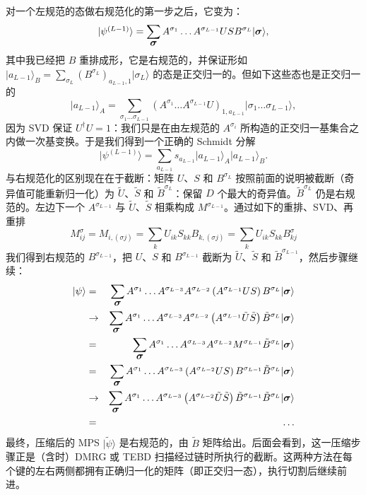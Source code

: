 \documentclass[a4paper,10pt,oneside,onecolumn,1p,times]{elsarticle}
\newcommand{\ket}[1]{\mbox{$| #1  \rangle$}}
\newcommand{\fat}[1]{\mbox{\boldmath$#1$\unboldmath}}	%
\begin{document}
对一个左规范的态做右规范化的第一步之后，它变为：
\begin{equation}
\ket{\psi^{(L-1)}} = \sum_{\fat{\sigma}} A^{\sigma_1} \ldots A^{\sigma_{L-1}} U S B^{\sigma_L} \ket{\fat{\sigma}} ,
\end{equation}
其中我已经把 $B$ 重排成形，它是右规范的，并保证形如 $\ket{a_{L-1}}_B = \sum_{\sigma_L} (B^{\sigma_L})_{a_{L-1},1} \ket{\sigma_L}$ 的态是正交归一的。但如下这些态也是正交归一的
\begin{equation}
\ket{a_{L-1}}_A = \sum_{\sigma_1 \ldots \sigma_{L-1}} (A^{\sigma_1} \ldots A^{\sigma_{L-1}} U)_{1,a_{L-1}} \ket{\sigma_1 \ldots \sigma_{L-1}},
\end{equation}
因为 SVD 保证 $U^\dagger U = 1$：我们只是在由左规范的 $A^{\sigma_i}$ 所构造的正交归一基集合之内做一次基变换。于是我们得到一个正确的 Schmidt 分解
\begin{equation}
\ket{\psi^{(L-1)}} = \sum_{a_{L-1}} s_{a_{L-1}} \ket{a_{L-1}}_A \ket{a_{L-1}}_B .
\end{equation}
与右规范化的区别现在在于截断：矩阵 $U$、$S$ 和 $B^{\sigma_L}$ 按照前面的说明被截断（奇异值可能重新归一化）为 $\tilde{U}$、$\tilde{S}$ 和 $\tilde{B}^{\sigma_L}$：保留 $D$ 个最大的奇异值。$\tilde{B}^{\sigma_L}$ 仍是右规范的。左边下一个 $A^{\sigma_{L-1}}$ 与 $\tilde{U}$、$\tilde{S}$ 相乘构成 $M^{\sigma_{L-1}}$。通过如下的重排、SVD、再重排
\begin{equation}
M^{\sigma}_{ij} = M_{i, (\sigma j)} = \sum_k U_{ik} S_{kk} B_{k,(\sigma j)} = \sum_k U_{ik} S_{kk} B^{\sigma}_{kj} 
\end{equation} 
我们得到右规范的 $B^{\sigma_{L-1}}$，把 $U$、$S$ 和 $B^{\sigma_{L-1}}$ 截断为 $\tilde{U}$、$\tilde{S}$ 和 $\tilde{B}^{\sigma_{L-1}}$，然后步骤继续：
\begin{eqnarray*}
\ket{\psi} &=& \sum_{\fat{\sigma}}  A^{\sigma_1} \ldots A^{\sigma_{L-3}}A^{\sigma_{L-2}} \left( A^{\sigma_{L-1}} U S \right)B^{\sigma_L}   \ket{\fat{\sigma}} \\
&\rightarrow& \sum_{\fat{\sigma}} A^{\sigma_1} \ldots A^{\sigma_{L-3}}A^{\sigma_{L-2}}\left( A^{\sigma_{L-1}} \tilde{U} \tilde{S} \right) \tilde{B}^{\sigma_L}   \ket{\fat{\sigma}} \\
&=&  \sum_{\fat{\sigma}} A^{\sigma_1} \ldots A^{\sigma_{L-3}}A^{\sigma_{L-2}} M^{\sigma_{L-1}} \tilde{B}^{\sigma_L}   \ket{\fat{\sigma}} \\
&=& \sum_{\fat{\sigma}} A^{\sigma_1} \ldots A^{\sigma_{L-3}} \left( A^{\sigma_{L-2}} U S \right) B^{\sigma_{L-1}} \tilde{B}^{\sigma_L}   \ket{\fat{\sigma}} \\
&\rightarrow& \sum_{\fat{\sigma}} A^{\sigma_1} \ldots A^{\sigma_{L-3}} \left( A^{\sigma_{L-2}} \tilde{U} \tilde{S} \right) \tilde{B}^{\sigma_{L-1}} \tilde{B}^{\sigma_L}   \ket{\fat{\sigma}} \\
&=& \ldots
\end{eqnarray*}
最终，压缩后的 MPS $\ket{\tilde{\psi}}$ 是右规范的，由 $\tilde{B}$ 矩阵给出。后面会看到，这一压缩步骤正是（含时）DMRG 或 TEBD 扫描经过链时所执行的截断。这两种方法在每个键的左右两侧都拥有正确归一化的矩阵（即正交归一态），执行切割后继续前进。
\end{document}
